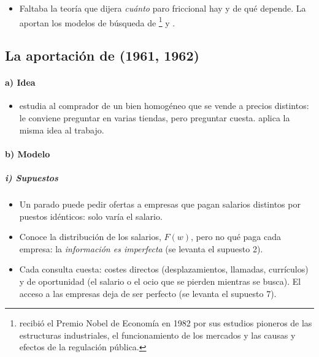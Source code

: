 \documentclass[11pt]{article}
\begin{document}
\begin{itemize}
\begin{itemize}
  \end{itemize}
\item Faltaba la teoría que dijera \emph{cuánto} paro friccional hay y de qué depende. La aportan los modelos de búsqueda de \footnote{ recibió el Premio Nobel de Economía en 1982 por sus estudios pioneros de las estructuras industriales, el funcionamiento de los mercados y las causas y efectos de la regulación pública\nocite{Nobel1982Stigler}.} y .
\end{itemize}

\subsection{La aportación de  (1961, 1962)}\label{sec:stigler}

\paragraph{a) Idea}

\begin{itemize}
\item \textcite{Stigler1961Information} estudia al comprador de un bien homogéneo que se vende a precios distintos: le conviene preguntar en varias tiendas, pero preguntar cuesta. \textcite{Stigler1962Labor} aplica la misma idea al trabajo.
\end{itemize}

\paragraph{b) Modelo}

\subparagraph{i) Supuestos}

\begin{itemize}
\item Un parado puede pedir ofertas a empresas que pagan salarios distintos por puestos idénticos: solo varía el salario.
\item Conoce la distribución de los salarios, $F(w)$, pero no qué paga cada empresa: la \emph{información es imperfecta} (se levanta el supuesto 2).
\item Cada consulta cuesta: costes directos (desplazamientos, llamadas, currículos) y de oportunidad (el salario o el ocio que se pierden mientras se busca). El acceso a las empresas deja de ser perfecto (se levanta el supuesto 7).
\end{itemize}
\end{document}
